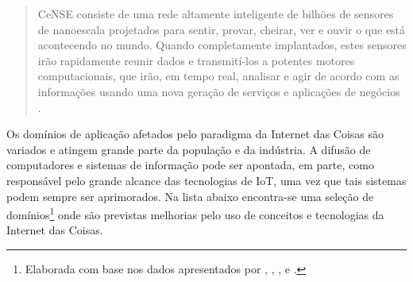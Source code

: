 \documentclass[twoside,english,brazilian]{UNISINOSmonografia}
\begin{document}
\begin{quote}
CeNSE consiste de uma rede altamente inteligente de bilhões de sensores de 
nanoescala projetados para sentir, provar, cheirar, ver e ouvir o que está 
acontecendo no mundo. Quando completamente implantados, estes sensores irão 
rapidamente reunir dados e transmití-los a potentes motores computacionais, 
que irão, em tempo real, analisar e agir de acordo com as informações usando 
uma nova geração de serviços e aplicações de negócios \cite{HP2009}.

\end{quote}


Os domínios de aplicação afetados pelo paradigma da Internet das Coisas são 
variados e atingem grande parte da população e da indústria.
A difusão de computadores e sistemas de informação pode ser apontada, em 
parte, como responsável pelo grande alcance das tecnologias de IoT, uma vez 
que tais sistemas podem sempre ser aprimorados.
Na lista abaixo encontra-se uma seleção de domínios\footnote{
Elaborada com base nos dados apresentados por 
,
,
,
 e
.
} onde são previstas melhorias pelo uso de conceitos e tecnologias da Internet 
das Coisas.
\end{document}
